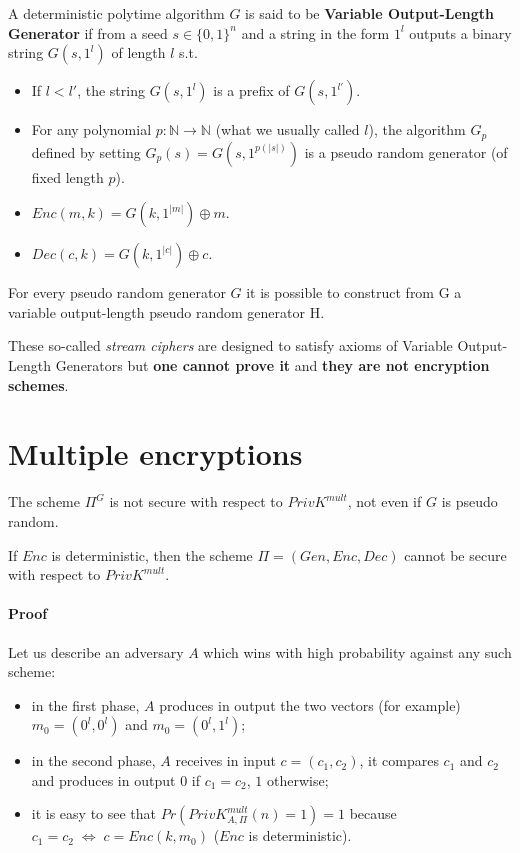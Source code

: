 \documentclass[../main]{subfiles}
\begin{document}
\begin{definition}
    A deterministic polytime algorithm $G$ is said to be \textbf{Variable Output-Length Generator} if from a seed $s \in{} \{0,1\}^n$ and a string in the form $1^l$ outputs a binary string $G(s,1^l)$ of length $l$ s.t.
    \begin{itemize}
        \item If $l < l'$, the string $G(s,1^l)$ is a prefix of $G(s,1^{l'})$.
        \item For any polynomial $p: \mathbb{N} \rightarrow{} \mathbb{N}$ (what we usually called $l$), the algorithm $G_p$ defined by setting $G_p(s)=G(s,1^{p(|s|)})$ is a pseudo random generator (of fixed length $p$).
        \item $Enc(m,k) = G(k, 1^{|m|}) \oplus m$.
        \item $Dec(c,k) = G(k, 1^{|c|}) \oplus c$.
    \end{itemize}
\end{definition}

\begin{lemma}
    For every pseudo random generator $G$ it is possible to construct from G a variable output-length pseudo random generator H.
\end{lemma}
\noindent
These so-called \textit{stream ciphers} are designed to satisfy axioms of Variable Output-Length Generators but \textbf{one cannot prove it} and \textbf{they are not encryption schemes}.

\section{Multiple encryptions}
\begin{lemma}
    The scheme $\Pi^G$ is not secure with respect to $PrivK^{mult}$, not even if $G$ is pseudo random.
\end{lemma}

\begin{theorem}
    If $Enc$ is deterministic, then the scheme $\Pi = (Gen, Enc, Dec)$ cannot be secure with respect to $PrivK^{mult}$.
\end{theorem}
\paragraph{Proof}
Let us describe an adversary $A$ which wins with high probability against any such scheme:
\begin{itemize}
    \item in the first phase, $A$ produces in output the two vectors (for example) $m_0 = (0^l, 0^l)$ and $m_0 = (0^l, 1^l)$;
    \item in the second phase, $A$ receives in input $c = (c_1, c_2)$, it compares $c_1$ and $c_2$ and produces in output $0$ if $c_1 = c_2$, $1$ otherwise;
    \item it is easy to see that $Pr(PrivK^{mult}_{A,\Pi}(n) = 1) = 1$ because $c_1 = c_2 \; \Leftrightarrow{} \; c = Enc(k,m_0)$ ($Enc$ is deterministic).
\end{itemize}
\end{document}
